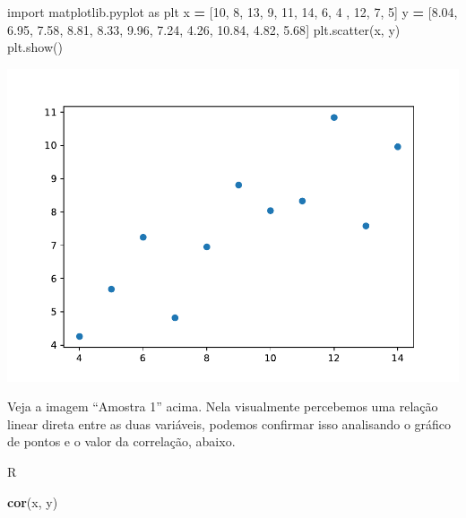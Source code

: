 \documentclass[
]{book}
\newenvironment{Shaded}{\begin{snugshade}}{\end{snugshade}}
\newcommand{\DecValTok}[1]{\textcolor[rgb]{0.00,0.00,0.81}{#1}}
\newcommand{\FloatTok}[1]{\textcolor[rgb]{0.00,0.00,0.81}{#1}}
\newcommand{\FunctionTok}[1]{\textcolor[rgb]{0.13,0.29,0.53}{\textbf{#1}}}
\newcommand{\ImportTok}[1]{#1}
\newcommand{\NormalTok}[1]{#1}
\newcommand{\OperatorTok}[1]{\textcolor[rgb]{0.81,0.36,0.00}{\textbf{#1}}}
\begin{document}
\begin{Shaded}
\begin{Highlighting}[]
\ImportTok{import}\NormalTok{ matplotlib.pyplot }\ImportTok{as}\NormalTok{ plt}
\NormalTok{x }\OperatorTok{=}\NormalTok{ [}\DecValTok{10}\NormalTok{, }\DecValTok{8}\NormalTok{, }\DecValTok{13}\NormalTok{, }\DecValTok{9}\NormalTok{, }\DecValTok{11}\NormalTok{, }\DecValTok{14}\NormalTok{, }\DecValTok{6}\NormalTok{, }\DecValTok{4}\NormalTok{ , }\DecValTok{12}\NormalTok{, }\DecValTok{7}\NormalTok{, }\DecValTok{5}\NormalTok{]}
\NormalTok{y }\OperatorTok{=}\NormalTok{ [}\FloatTok{8.04}\NormalTok{, }\FloatTok{6.95}\NormalTok{, }\FloatTok{7.58}\NormalTok{, }\FloatTok{8.81}\NormalTok{, }\FloatTok{8.33}\NormalTok{, }\FloatTok{9.96}\NormalTok{, }\FloatTok{7.24}\NormalTok{, }\FloatTok{4.26}\NormalTok{, }\FloatTok{10.84}\NormalTok{, }\FloatTok{4.82}\NormalTok{, }\FloatTok{5.68}\NormalTok{]}
\NormalTok{plt.scatter(x, y)}
\NormalTok{plt.show()}
\end{Highlighting}
\end{Shaded}

\includegraphics{_main_files/figure-latex/unnamed-chunk-12-1.pdf}

Veja a imagem ``Amostra 1'' acima. Nela visualmente percebemos uma relação linear direta entre as duas variáveis, podemos confirmar isso analisando o gráfico de pontos e o valor da correlação, abaixo.

R

\begin{Shaded}
\begin{Highlighting}[]
\FunctionTok{cor}\NormalTok{(x, y)  }
\end{Highlighting}
\end{Shaded}
\end{document}

